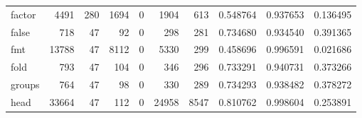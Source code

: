 \begin{tabular}{lrrrrrrrrr}
factor    &                                               4491 &                                                280 &                                               1694 &                                                  0 &                                               1904 &                                                613 &                                           0.548764 &                               0.937653 &                             0.136495 \\
false     &                                                718 &                                                 47 &                                                 92 &                                                  0 &                                                298 &                                                281 &                                           0.734680 &                               0.934540 &                             0.391365 \\
fmt       &                                              13788 &                                                 47 &                                               8112 &                                                  0 &                                               5330 &                                                299 &                                           0.458696 &                               0.996591 &                             0.021686 \\
fold      &                                                793 &                                                 47 &                                                104 &                                                  0 &                                                346 &                                                296 &                                           0.733291 &                               0.940731 &                             0.373266 \\
groups    &                                                764 &                                                 47 &                                                 98 &                                                  0 &                                                330 &                                                289 &                                           0.734293 &                               0.938482 &                             0.378272 \\
head      &                                              33664 &                                                 47 &                                                112 &                                                  0 &                                              24958 &                                               8547 &                                           0.810762 &                               0.998604 &                             0.253891 \\

\end{tabular}
